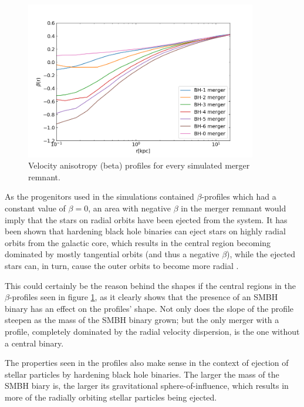 \documentclass[english, oneside]{HYgradu}
\begin{document}
\begin{figure}[h]
	\centering
	\includegraphics[width=0.9\textwidth]{beta_no_rb.png}
	\caption{Velocity anisotropy (beta) profiles for every simulated merger remnant.}
	\label{figure:beta_no_rb}
\end{figure}

As the progenitors used in the simulations contained $\beta$-profiles which had a constant value of $\beta = 0$, an area with negative $\beta$ in the merger remnant would imply that the stars on radial orbits have been ejected from the system. It has been shown that hardening black hole binaries can eject stars on highly radial orbits from the galactic core, which results in the central region becoming dominated by mostly tangential orbits (and thus a negative $\beta$), while the ejected stars can, in turn, cause the outer orbits to become more radial \citep{Quinlan1997, Milosavljevic2001, Thomas2014}. 

This could certainly be the reason behind the shapes if the central regions in the $\beta$-profiles seen in figure \ref{figure:beta_no_rb}, as it clearly shows that the presence of an SMBH binary has an effect on the profiles' shape. Not only does the slope of the profile steepen as the mass of the SMBH binary grown; but the only merger with a profile, completely dominated by the radial velocity dispersion, is the one without a central binary. 

The properties seen in the profiles also make sense in the context of ejection of stellar particles by hardening black hole binaries. The larger the mass of the SMBH biary is, the larger its gravitational sphere-of-influence, which results in more of the radially orbiting stellar particles being ejected.
\end{document}
